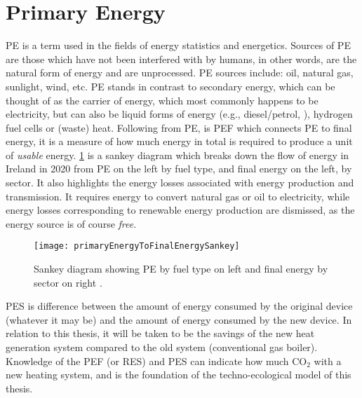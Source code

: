 \section{Primary Energy}\label{sec:primaryenergy}
\ac{PE} is a term used in the fields of energy statistics and energetics. Sources of \ac{PE} are those which have not been interfered with by humans, in other words, are the natural form of energy and are unprocessed. \ac{PE} sources include: oil, natural gas, sunlight, wind, etc. \ac{PE} stands in contrast to secondary energy, which can be thought of as the carrier of energy, which most commonly happens to be electricity, but can also be liquid forms of energy (e.g., diesel/petrol, ), hydrogen fuel cells or (waste) heat. Following from \ac{PE}, is \ac{PEF} which connects \ac{PE} to final energy, it is a measure of how much energy in total is required to produce a unit of \textit{usable} energy. \cref{fig:PEtoFinalSankey} is a sankey diagram which breaks down the flow of energy in Ireland in 2020 from \ac{PE} on the left by fuel type, and final energy on the left, by sector. It also highlights the energy losses associated with energy production and transmission. It requires energy to convert natural gas or oil to electricity, while energy losses corresponding to renewable energy production are dismissed, as the energy source is of course \textit{free}. 

\begin{figure}[htb]
    \centering
    \texttt{[image: primaryEnergyToFinalEnergySankey]}
    \caption[\acs{PE} breakdown by fuel type and sector]{Sankey diagram showing \acs{PE} by fuel type on left and final energy by sector on right \cite{seai_energy_2021}.}
    \label{fig:PEtoFinalSankey}
\end{figure}

\ac{PES} is difference between the amount of energy consumed by the original device (whatever it may be) and the amount of energy consumed by the new device. In relation to this thesis, it will be taken to be the savings of the new heat generation system compared to the old system (conventional gas boiler). Knowledge of the \ac{PEF} (or \ac{RES}) and \ac{PES} can indicate how much $\text{CO}_2$ with a new heating system, and is the foundation of the techno-ecological model of this thesis. 

